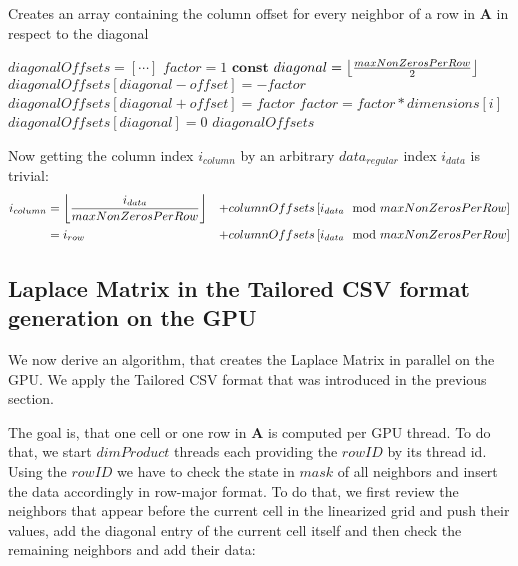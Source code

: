 \begin{algorithm}
\caption{Creates an array containing the column offset for every neighbor of a row in \textbf{A} in respect to the diagonal}\label{diagonalOffsets}
\begin{algorithmic}[1]
	\State $diagonalOffsets = \left[ \cdots \right]$  
	\State $factor = 1$
	\State $\mathbf{const}$ $diagonal = \floor*{\frac{maxNonZerosPerRow}{2}}$
	\State 
    	\State $diagonalOffsets[diagonal - offset] = -factor$
        \State $diagonalOffsets[diagonal + offset] = factor$
        \State $factor = factor * dimensions[i]$
	\EndFor
	\State $diagonalOffsets[diagonal] = 0$
	\State \Return $diagonalOffsets$
	
\EndFunction
\end{algorithmic}
\end{algorithm}
Now getting the column index $i_{column}$ by an arbitrary $data_{regular}$ index $i_{data}$ is trivial:
\begin{equation}
\begin{aligned}
	i_{column} & = \floor*{\frac{i_{data}}{maxNonZerosPerRow}} & + columnOffsets\left[ i_{data} \mod maxNonZerosPerRow \right]\\
			   & = i_{row} & + columnOffsets\left[ i_{data} \mod maxNonZerosPerRow \right]\\
\end{aligned}
\end{equation}


\subsection{Laplace Matrix in the Tailored CSV format generation on the GPU}\label{laplace-creation}
We now derive an algorithm, that creates the Laplace Matrix in parallel on the GPU. We apply the Tailored CSV format that was introduced in the previous section. 
\par The goal is, that one cell or one row in \textbf{A} is computed per GPU thread. To do that, we start  $dimProduct$ threads each providing the $rowID$ by its thread id. Using the $rowID$ we have to check the state in $mask$ of all neighbors and insert the data accordingly in row-major format. To do that, we first review the neighbors that appear before the current cell in the linearized grid and push their values, add the diagonal entry of the current cell itself and then check the remaining neighbors and add their data:

